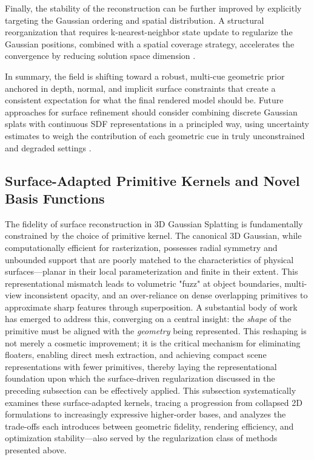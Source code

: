 \documentclass[11pt,a4paper]{article}
\begin{document}
Finally, the stability of the reconstruction can be further improved by explicitly targeting the Gaussian ordering and spatial distribution. A structural reorganization that requires k-nearest-neighbor state update to regularize the Gaussian positions, combined with a spatial coverage strategy, accelerates the convergence by reducing solution space dimension \cite{arxiv:2411.12788v2}.

In summary, the field is shifting toward a robust, multi-cue geometric prior anchored in depth, normal, and implicit surface constraints that create a consistent expectation for what the final rendered model should be. Future approaches for surface refinement should consider combining discrete Gaussian splats with continuous SDF representations in a principled way, using uncertainty estimates to weigh the contribution of each geometric cue in truly unconstrained and degraded settings \cite{arxiv:2401.03890v2,arxiv:2403.17888v1}.


\subsection{Surface-Adapted Primitive Kernels and Novel Basis Functions}


The fidelity of surface reconstruction in 3D Gaussian Splatting is fundamentally constrained by the choice of primitive kernel. The canonical 3D Gaussian, while computationally efficient for rasterization, possesses radial symmetry and unbounded support that are poorly matched to the characteristics of physical surfaces---planar in their local parameterization and finite in their extent. This representational mismatch leads to volumetric "fuzz" at object boundaries, multi-view inconsistent opacity, and an over-reliance on dense overlapping primitives to approximate sharp features through superposition. A substantial body of work has emerged to address this, converging on a central insight: the \emph{shape} of the primitive must be aligned with the \emph{geometry} being represented. This reshaping is not merely a cosmetic improvement; it is the critical mechanism for eliminating floaters, enabling direct mesh extraction, and achieving compact scene representations with fewer primitives, thereby laying the representational foundation upon which the surface-driven regularization discussed in the preceding subsection can be effectively applied. This subsection systematically examines these surface-adapted kernels, tracing a progression from collapsed 2D formulations to increasingly expressive higher-order bases, and analyzes the trade-offs each introduces between geometric fidelity, rendering efficiency, and optimization stability---also served by the regularization class of methods presented above.
\end{document}
